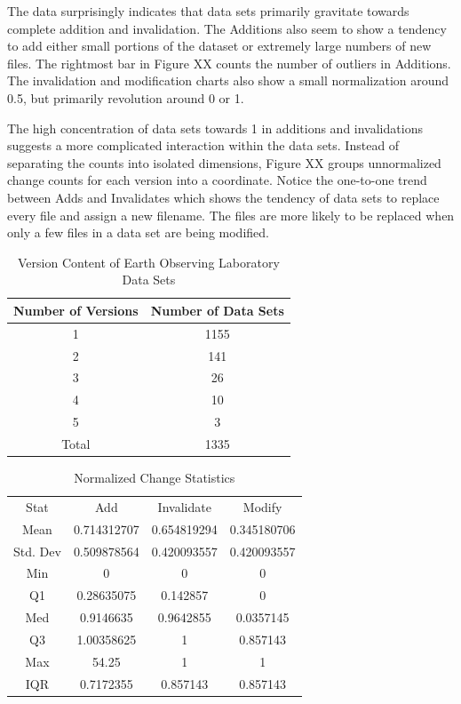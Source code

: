 The data surprisingly indicates that data sets primarily gravitate towards complete addition and invalidation.  The Additions also seem to show a tendency to add either small portions of the dataset or extremely large numbers of new files.  The rightmost bar in Figure XX counts the number of outliers in Additions.  The invalidation and modification charts also show a small normalization around 0.5, but primarily revolution around 0 or 1.

The high concentration of data sets towards 1 in additions and invalidations suggests a more complicated interaction within the data sets.  Instead of separating the counts into isolated dimensions, Figure XX groups unnormalized change counts for each version into a coordinate.  Notice the one-to-one trend between Adds and Invalidates which shows the tendency of data sets to replace every file and assign a new filename.  The files are more likely to be replaced when only a few files in a data set are being modified.

\begin{table}
	\caption{Version Content of Earth Observing Laboratory Data Sets}
	\label{table:EOL_Versions}
	\centering
	\begin{tabular}{|c|c|}
		\hline
		Number of Versions& Number of Data Sets\\ \hline
		1&	1155\\
		2&	141\\
		3&	26\\
		4&	10\\
		5&	3\\
		Total&	1335\\
		\hline
	\end{tabular}
\end{table}

\begin{table}
	\caption{Normalized Change Statistics}
	\label{table:EOL_Change}
	\centering
	\begin{tabular}{|c|c|c|c|}
		\hline
		Stat&	Add&	Invalidate&	Modify\\
		Mean&	0.714312707&	0.654819294&	0.345180706\\
		Std. Dev&	0.509878564&	0.420093557&	0.420093557\\
		Min&	0&	0&	0\\
		Q1&	0.28635075&	0.142857&	0\\
		Med&	0.9146635&	0.9642855&	0.0357145\\
		Q3&	1.00358625&	1&	0.857143\\
		Max&	54.25&	1&	1\\
		IQR&	0.7172355&	0.857143&	0.857143\\
		\hline
	\end{tabular}
\end{table}


